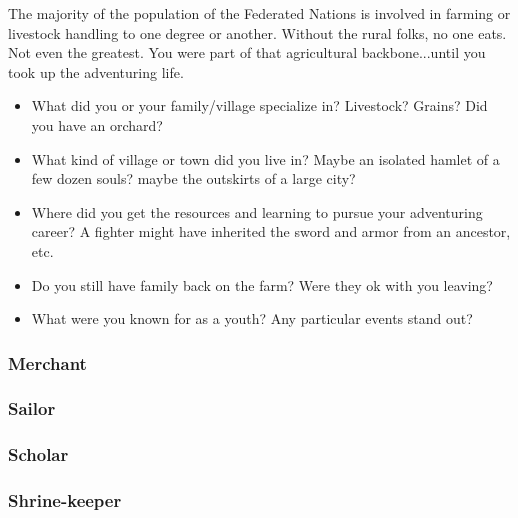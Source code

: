 The majority of the population of the Federated Nations is involved in farming or livestock handling to one degree or another. Without the rural folks, no one eats. Not even the greatest. You were part of that agricultural backbone...until you took up the adventuring life.

\begin{itemize}
	\item What did you or your family/village specialize in? Livestock? Grains? Did you have an orchard?
	\item What kind of village or town did you live in? Maybe an isolated hamlet of a few dozen souls? maybe the outskirts of a large city?
	\item Where did you get the resources and learning to pursue your adventuring career? A fighter might have inherited the sword and armor from an ancestor, etc.
	\item Do you still have family back on the farm? Were they ok with you leaving?
	\item What were you known for as a youth? Any particular events stand out?
\end{itemize}

\subsubsection{Merchant}

\subsubsection{Sailor}

\subsubsection{Scholar}

\subsubsection{Shrine-keeper}

